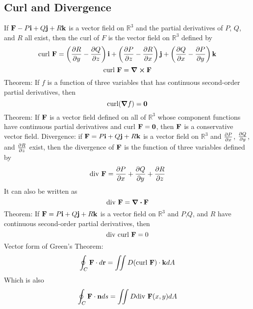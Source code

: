 \documentclass{article}
\begin{document}
    \subsection{Curl and Divergence}
    \begin{outline}
        \1 If \(\vb F-P\vb i+Q\vb j+R\vb k\) is a vector field on \(\mathbb R^3\) and the partial derivatives of $P$, $Q$, and $R$ all exist, then the curl of $F$ is the vector field on \(\mathbb R^3\) defined by \[\text{curl }\vb F=\left(\pdv{R}{y}-\pdv{Q}{z}\right)\vb i+\left(\pdv{P}{z}-\pdv{R}{x}\right)\vb j+\left(\pdv{Q}{x}-\pdv{P}{y}\right)\vb k\] 
        \1 \[\text{curl }\vb F=\curl\vb F\]
        \1 Theorem: If $f$ is a function of three variables that has continuous second-order partial derivatives, then \[\text{curl}(\grad f)=\vb 0\]
        \1 Theorem: If \(\vb F\) is a vector field defined on all of \(\mathbb R^3\) whose component functions have continuous partial derivatives and curl \(\vb F=\vb 0\), then \(\vb F\) is a conservative vector field. 
        \1 Divergence: if \(\vb F=P\vb i+Q\vb j+R\vb k\) is a vector field on \(\mathbb R^3\) and \(\pdv{P}{x}\), \(\pdv{Q}{y}\), and \(\pdv{R}{z}\) exist, then the divergence of \(\vb F\) is the function of three variables defined by \[\text{div }\vb F=\pdv{P}{x}+\pdv{Q}{y}+\pdv{R}{z}\] It can also be written as \[\text{div }\vb F=\div \vb F\]
        \1 Theorem: If \(\vb F=P\vb i+Q\vb j+R\vb k\) is a vector field on \(\mathbb R^3\) and \(P\),\(Q\), and \(R\) have continuous second-order partial derivatives, then \[\text{div curl }\vb F=0\]
        \1 Vector form of Green's Theorem: \[\oint_C\vb F\cdot d\vb r=\iint\limits D(\text{curl }\vb F)\cdot\vb kdA\]
        \1 Which is also \[\oint_C\vb F\cdot\vb nds=\iint\limits D\text{div }\vb F(x,y)dA\]

    \end{outline}
\end{document}
